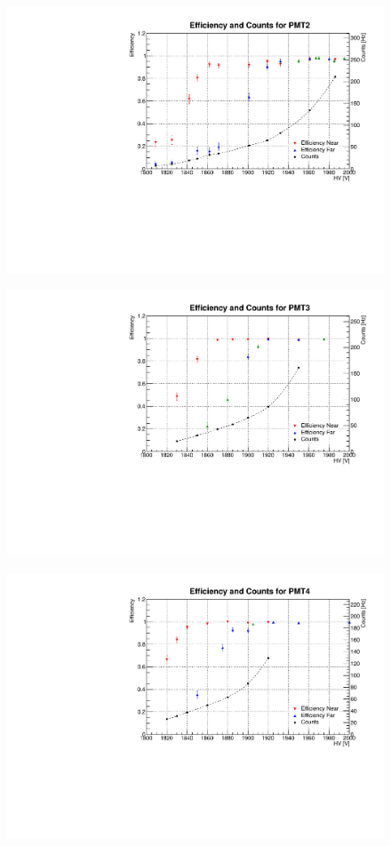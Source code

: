 \begin{figure}[h]
	\centerline{\includegraphics[scale=0.8]{img/eff2.pdf}}	
\end{figure}
\begin{figure}[h]
	\centerline{\includegraphics[scale=0.8]{img/eff3.pdf}}	
\end{figure}
\begin{figure}[h]
	\centerline{\includegraphics[scale=0.8]{img/eff4.pdf}}
\end{figure}
